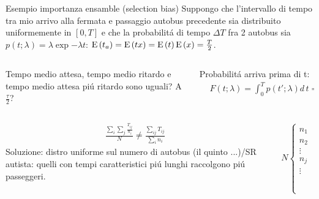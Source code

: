 \documentclass[asd-beamer.tex]{subfiles}
\begin{document}
\begin{wordonframe}{Esempio importanza ensamble (selection bias)}
	Suppongo che l'intervallo di tempo tra mio arrivo alla fermata e passaggio autobus precedente sia distribuito uniformemente in $[0,T]$ e che la probabilit\'a di tempo $\Delta T$ fra 2 autobus sia  $p(t;\lambda)=\lambda\exp{-\lambda t}$: $\operatorname{E}{(t_a)}=\operatorname{E}{(tx)}=\operatorname{E}{(t)}\operatorname{E}{(x)}=\frac{T}{2}$.
	\begin{columns}[T]
		\begin{column}{0.4\textwidth}
			Tempo medio attesa, tempo medio ritardo e tempo medio attesa pi\'u ritardo sono uguali? A $\frac{\tau}{2}$?
		\end{column}
		\begin{column}{0.6\textwidth}
			Probabilit\'a arriva prima di t:
			\begin{align*}
			&F(t;\lambda)=\int_0^Tp(t';\lambda)d\,t=1-F(T)=1-\exp{-\lambda T}
			\end{align*}
		\end{column}
	\end{columns}
	\begin{columns}[T]
		\begin{column}{0.55\textwidth}
			\begin{align*}
			&\frac{\sum_i\sum_j\frac{T_{ij}}{n_i}}{N}\neq\frac{\sum_{ij}T_{ij}}{\sum_in_i}
			\end{align*}
			Soluzione: distro uniforme sul numero di autobus (il quinto ...)/SR autista: quelli con tempi caratteristici pi\'u lunghi raccolgono pi\'u passeggeri.
		\end{column}
		\begin{column}{0.45\textwidth}
			\begin{align*}
			&N\left\{\begin{array}{cccc}
			n_1&T_1&\ldots&T_{n_1}\\
			n_2&&&\\
			\vdots&&&\\
			n_j&&&\\
			\vdots&&&\\
			&\frac{T}{2}&\ldots&\frac{T}{2}\\
			\end{array}\right.
			\end{align*}
		\end{column}
	\end{columns}
\end{wordonframe}
\end{document}
